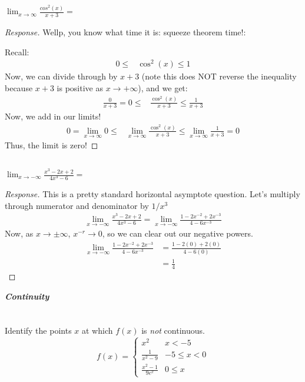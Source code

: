 \documentclass[english]{article}
\newcommand{\prob}[1]{\setcounter{section}{#1-1}\section{}}
\newcommand{\prt}[1]{\setcounter{subsection}{#1-1}\subsection{}}
\theoremstyle{remark}
\theoremstyle{definition}
\newcommand{\resp}[1]{\begin{proof}[Response]{#1}\end{proof}}
\begin{document}
	\prt{2}	$\displaystyle{\lim_{x\to \infty} \frac{cos^2(x)}{x+3}=}$\resp{
Wellp, you know what time it is: squeeze theorem time!:

Recall: \begin{align*}0\leq &\cos^2(x)\leq 1
\end{align*}
Now, we can divide through by $x+3$ (note this does NOT reverse the inequality because $x+3$ is positive as $x\to+\infty$), and we get:
\begin{align*}\frac{0}{x+3}=0\leq &\frac{\cos^2(x)}{x+3}\leq \frac{1}{x+3}
\end{align*}
Now, we add in our limits!
\begin{align*}
	0=\lim_{x\to \infty}0\leq &\lim_{x\to \infty}\frac{\cos^2(x)}{x+3}\leq \lim_{x\to \infty}\frac{1}{x+3}=0
\end{align*}
Thus, the limit is zero!
}
	\prt{3} $\displaystyle{\lim_{x\to -\infty} \frac{x^3-2x+2}{4x^3-6}=}$\resp{
This is a pretty standard horizontal asymptote question. Let's multiply through numerator and denominator by $1/x^3$
\begin{align*}\lim_{x\to -\infty} \frac{x^3-2x+2}{4x^3-6}=\lim_{x\to-\infty}\frac{1-2x^{-2}+2x^{-3}}{4-6x^{-3}}\end{align*}
	Now, as $x\to \pm \infty$, $x^{-r}\to 0$, so we can clear out our negative powers.\begin{align*}
		\lim_{x\to-\infty}\frac{1-2x^{-2}+2x^{-3}}{4-6x^{-3}}&=\frac{1-2(0)+2(0)}{4-6(0)}\\&=\frac{1}{4}
	\end{align*}
}\newpage
	\begin{center}{\LARGE\textbf{\emph{Continuity}}}\end{center}
	\prob{3} Identify the points $x$ at which $f(x)$ is \emph{not} continuous.
	\begin{equation*} f(x)=\begin{cases}
x^2&x<-5\\
\frac{1}{x^2-9}&-5\leq x<0\\
\frac{x^2-1}{9e^x}& 0\leq x 
	\end{cases}
	\end{equation*}
\end{document}
